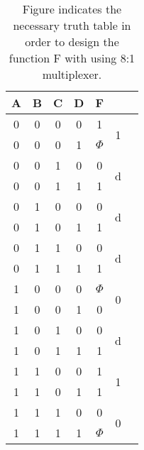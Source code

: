 \begin{table}
\centering
    \begin{tabular}{|c|c|c|c|c|c|c|}
    \hline
         A & B & C & D & F &     \\
         \hline
         0 & 0 & 0 & 0 & 1 & \multirow{2}{1em}{1} \\
         0 & 0 & 0 & 1 & ${\Phi}$ & \\
         \hline
         0 & 0 & 1 & 0 & 0 & \multirow{2}{1em}{d}\\
         0 & 0 & 1 & 1 & 1 & \\
         \hline
         0 & 1 & 0 & 0 & 0 & \multirow{2}{1em}{d}\\
         0 & 1 & 0 & 1 & 1 & \\
         \hline
         0 & 1 & 1 & 0 & 0 & \multirow{2}{1em}{d}\\
         0 & 1 & 1 & 1 & 1 & \\
         \hline
         1 & 0 & 0 & 0 & ${\Phi}$ & \multirow{2}{1em}{0} \\
         1 & 0 & 0 & 1 & 0 & \\
         \hline
         1 & 0 & 1 & 0 & 0 & \multirow{2}{1em}{d}\\
         1 & 0 & 1 & 1 & 1 & \\
         \hline
         1 & 1 & 0 & 0 & 1 & \multirow{2}{1em}{1}\\
         1 & 1 & 0 & 1 & 1 & \\
         \hline
         1 & 1 & 1 & 0 & 0 & \multirow{2}{1em}{0}\\
         1 & 1 & 1 & 1 & ${\Phi}$ & \\
         \hline
    \end{tabular}
    \caption{Figure indicates the necessary truth table in order to design the function F with using 8:1 multiplexer.}
    \label{part1-mux-truth-table}

\end{table}







